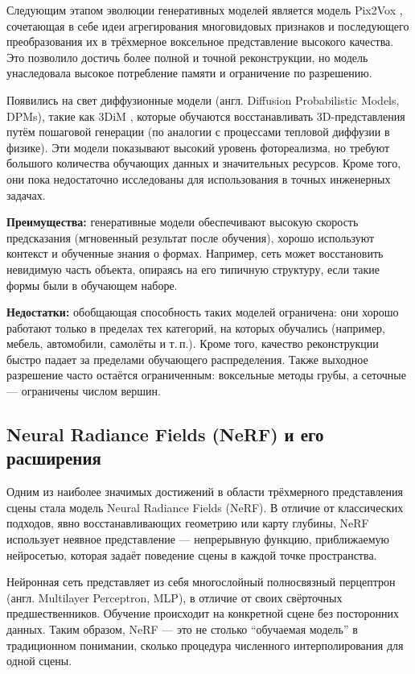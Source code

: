 Следующим этапом эволюции генеративных моделей является модель Pix2Vox
\cite{Xie_2019}, сочетающая в себе идеи агрегирования многовидовых признаков и
последующего преобразования их в трёхмерное воксельное представление высокого
качества. Это позволило достичь более полной и точной реконструкции, но модель
унаследовала высокое потребление памяти и ограничение по разрешению.

Появились на свет диффузионные модели (англ. Diffusion Probabilistic Models,
DPMs), такие как 3DiM \cite{watson2022novelviewsynthesisdiffusion}, которые
обучаются восстанавливать 3D-представления путём пошаговой генерации (по
аналогии с процессами тепловой диффузии в физике). Эти модели показывают высокий
уровень фотореализма, но требуют большого количества обучающих данных и
значительных ресурсов. Кроме того, они пока недостаточно исследованы для
использования в точных инженерных задачах.

\textbf{Преимущества:} генеративные модели обеспечивают высокую скорость
предсказания (мгновенный результат после обучения), хорошо используют контекст и
обученные знания о формах. Например, сеть может восстановить невидимую часть
объекта, опираясь на его типичную структуру, если такие формы были в обучающем
наборе.

\textbf{Недостатки:} обобщающая способность таких моделей ограничена: они хорошо
работают только в пределах тех категорий, на которых обучались (например,
мебель, автомобили, самолёты и т.\,п.). Кроме того, качество реконструкции
быстро падает за пределами обучающего распределения.  Также выходное разрешение
часто остаётся ограниченным: воксельные методы грубы, а сеточные — ограничены
числом вершин.

\subsection{Neural Radiance Fields (NeRF) и его расширения}

Одним из наиболее значимых достижений в области трёхмерного представления сцены
стала модель Neural Radiance Fields (NeRF). В отличие от классических подходов,
явно восстанавливающих геометрию или карту глубины, NeRF использует
неявное представление — непрерывную функцию, приближаемую нейросетью, которая
задаёт поведение сцены в каждой точке пространства.

Нейронная сеть представляет из себя многослойный полносвязный перцептрон (англ.
Multilayer Perceptron, MLP), в отличие от своих свёрточных предшественников.
Обучение происходит на конкретной сцене без посторонних данных. Таким образом,
NeRF — это не столько ``обучаемая модель'' в традиционном понимании, сколько
процедура численного интерполирования для одной сцены.

